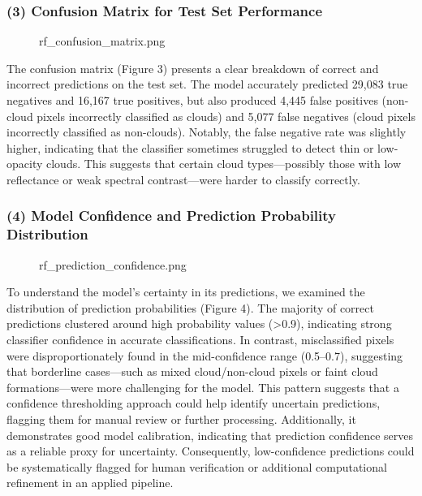 \documentclass[11pt]{article}
\begin{document}
\subsubsection*{(3) Confusion Matrix for Test Set
Performance}\label{confusion-matrix-for-test-set-performance}

\begin{figure}
\centering
{}
\caption{rf\_confusion\_matrix.png}
\end{figure}

The confusion matrix (Figure 3) presents a clear breakdown of correct
and incorrect predictions on the test set. The model accurately
predicted 29,083 true negatives and 16,167 true positives, but also
produced 4,445 false positives (non-cloud pixels incorrectly classified
as clouds) and 5,077 false negatives (cloud pixels incorrectly
classified as non-clouds). Notably, the false negative rate was slightly
higher, indicating that the classifier sometimes struggled to detect
thin or low-opacity clouds. This suggests that certain cloud
types---possibly those with low reflectance or weak spectral
contrast---were harder to classify correctly.

\subsubsection*{(4) Model Confidence and Prediction Probability
Distribution}\label{model-confidence-and-prediction-probability-distribution}

\begin{figure}
\centering
{}
\caption{rf\_prediction\_confidence.png}
\end{figure}

To understand the model's certainty in its predictions, we examined the
distribution of prediction probabilities (Figure 4). The majority of
correct predictions clustered around high probability values
(\textgreater0.9), indicating strong classifier confidence in accurate
classifications. In contrast, misclassified pixels were
disproportionately found in the mid-confidence range (0.5--0.7),
suggesting that borderline cases---such as mixed cloud/non-cloud pixels
or faint cloud formations---were more challenging for the model. This
pattern suggests that a confidence thresholding approach could help
identify uncertain predictions, flagging them for manual review or
further processing. Additionally, it demonstrates good model
calibration, indicating that prediction confidence serves as a reliable
proxy for uncertainty. Consequently, low-confidence predictions could be
systematically flagged for human verification or additional
computational refinement in an applied pipeline.
\end{document}
